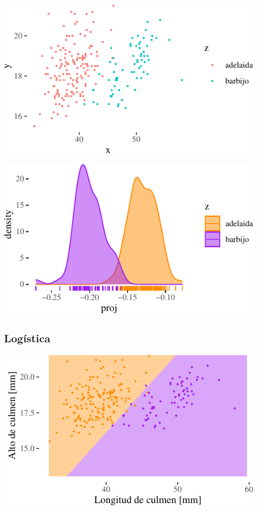 \documentclass[]{tufte-handout}
\begin{document}
\begin{center}\includegraphics{TP-Labo-2_files/figure-latex/unnamed-chunk-11-1} \end{center}

\begin{center}\includegraphics{TP-Labo-2_files/figure-latex/unnamed-chunk-11-2} \end{center}

\hypertarget{loguxedstica}{%
\subsection{Logística}\label{loguxedstica}}

\begin{center}\includegraphics{TP-Labo-2_files/figure-latex/unnamed-chunk-12-1} \end{center}
\end{document}
